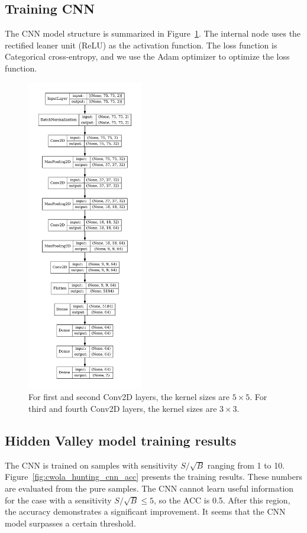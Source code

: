 \documentclass[12pt]{article}
\begin{document}
	\subsection{Training CNN}%
	\label{sub:training_cnn}
		The CNN model structure is summarized in Figure~\ref{fig:cnn_model_structure}. The internal node uses the rectified leaner unit (ReLU) as the activation function. The loss function is Categorical cross-entropy, and we use the Adam optimizer to optimize the loss function.
		\begin{figure}[htpb]
			\centering
			\includegraphics[width=0.45\textwidth]{CNN_model_structure.pdf}
			\caption{For first and second Conv2D layers, the kernel sizes are $5 \times 5$. For third and fourth Conv2D layers, the kernel sizes are $3 \times 3$.}
			\label{fig:cnn_model_structure}
		\end{figure}
	\subsection{Hidden Valley model training results}%
	\label{sub:hidden_valley_model_training_results}
		The CNN is trained on samples with sensitivity $S / \sqrt{B}$ ranging from 1 to 10. Figure~\ref{fig:cwola_hunting_cnn_acc} presents the training results. These numbers are evaluated from the pure samples. The CNN cannot learn useful information for the case with a sensitivity $S / \sqrt{B} \le  5$, so the ACC is 0.5. After this region, the accuracy demonstrates a significant improvement. It seems that the CNN model surpasses a certain threshold.
\end{document}
